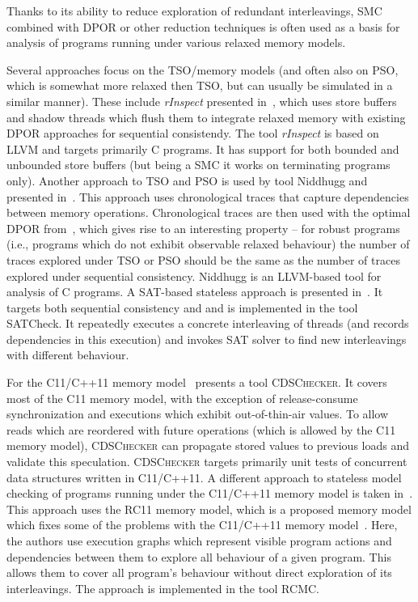 Thanks to its ability to reduce exploration of redundant interleavings, SMC
combined with DPOR or other reduction techniques is often used as a basis for
analysis of programs running under various relaxed memory models.

Several approaches focus on the TSO/\xtso memory models (and often also on PSO,
which is somewhat more relaxed then TSO, but can usually be simulated in a
similar manner).
These include \emph{rInspect} presented in~\cite{Zhang2015}, which uses store
buffers and shadow threads which flush them to integrate relaxed memory with
existing DPOR approaches for sequential consistendy.
The tool \emph{rInspect} is based on LLVM and targets primarily C programs.
It has support for both bounded and unbounded store buffers (but being a SMC it
works on terminating programs only).
Another approach to TSO and PSO is used by tool Niddhugg and presented
in~\cite{Abdulla2015}.
This approach uses chronological traces that capture dependencies between
memory operations.
Chronological traces are then used with the optimal DPOR
from~\cite{Abdulla2014}, which gives rise to an interesting property -- for
robust programs (i.e., programs which do not exhibit observable relaxed
behaviour) the number of traces explored under TSO or PSO should be the same as
the number of traces explored under sequential consistency.
Niddhugg is an LLVM-based tool for analysis of C programs.
A SAT-based stateless approach is presented in~\cite{Demsky2015}.
It targets both sequential consistency and \xtso and is implemented in the tool
SATCheck.
It repeatedly executes a concrete interleaving of threads (and records
dependencies in this execution) and invokes SAT solver to find new
interleavings with different behaviour.

For the C11/C++11 memory model~\cite{Norris2013} presents a tool \textsc{CDSChecker}.
It covers most of the C11 memory model, with the exception of release-consume
synchronization and executions which exhibit out-of-thin-air
values.
To allow reads which are reordered with future operations (which is allowed by
the C11 memory model), \textsc{CDSChecker} can propagate stored values to
previous loads and validate this speculation.
\textsc{CDSChecker} targets primarily unit tests of concurrent data structures
written in C11/C++11.
A different approach to stateless model checking of programs running under the
C11/C++11 memory model is taken in~\cite{Kokologiannakis2017}.
This approach uses the RC11 memory model, which is a proposed memory model
which fixes some of the problems with the C11/C++11 memory
model~\cite{Lahav2017}.
Here, the authors use execution graphs which represent visible program actions
and dependencies between them to explore all behaviour of a given program.
This allows them to cover all program's behaviour without direct exploration of
its interleavings.
The approach is implemented in the tool RCMC.


